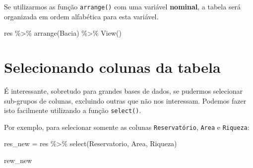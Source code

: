 \documentclass[
]{book}
\newenvironment{Shaded}{\begin{snugshade}}{\end{snugshade}}
\newcommand{\FunctionTok}[1]{\textcolor[rgb]{0.00,0.00,0.00}{#1}}
\newcommand{\NormalTok}[1]{#1}
\newcommand{\OtherTok}[1]{\textcolor[rgb]{0.56,0.35,0.01}{#1}}
\newcommand{\SpecialCharTok}[1]{\textcolor[rgb]{0.00,0.00,0.00}{#1}}
\begin{document}
Se utilizarmos as função \texttt{arrange()} com uma variável \textbf{nominal}, a tabela será organizada em ordem alfabética para esta variável.

\begin{Shaded}
\begin{Highlighting}[]
\NormalTok{res }\SpecialCharTok{\%\textgreater{}\%} 
  \FunctionTok{arrange}\NormalTok{(Bacia) }\SpecialCharTok{\%\textgreater{}\%} 
  \FunctionTok{View}\NormalTok{()}
\end{Highlighting}
\end{Shaded}

\hypertarget{selecionando-colunas-da-tabela}{%
\section{Selecionando colunas da tabela}\label{selecionando-colunas-da-tabela}}

É interessante, sobretudo para grandes bases de dados, se pudermos selecionar sub-grupos de colunas, excluindo outras que não nos interessam. Podemos fazer isto facilmente utilizando a função \texttt{select()}.

Por exemplo, para selecionar somente as colunas \texttt{Reservatório}, \texttt{Area} e \texttt{Riqueza}:

\begin{Shaded}
\begin{Highlighting}[]
\NormalTok{res\_new }\OtherTok{=}\NormalTok{ res }\SpecialCharTok{\%\textgreater{}\%} 
  \FunctionTok{select}\NormalTok{(Reservatorio, Area, Riqueza)}

\NormalTok{rew\_new}
\end{Highlighting}
\end{Shaded}
\end{document}

